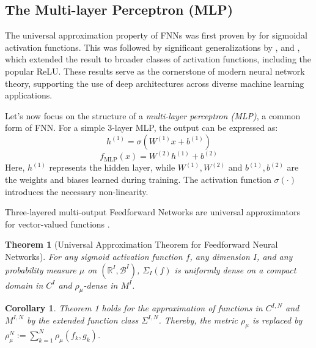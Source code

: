 \documentclass{article}
\newtheorem{theorem}{Theorem}
\newtheorem{corollary}{Corollary}[theorem]
\theoremstyle{definition}
\theoremstyle{remark}
\newcounter{ct}
\begin{document}
\citep{mhaskar2019function}

\subsection{The Multi-layer Perceptron (MLP)}

The universal approximation property of FNNs was first proven by \citep{cybenko1989approximation} for sigmoidal activation functions. This was followed by significant generalizations by \citep{hornik1989multilayer}, \citep{funahashi1989approximate} and \citep{hechtnielsen1992backpropagation}, which extended the result to broader classes of activation functions, including the popular ReLU.
These results serve as the cornerstone of modern neural network theory, supporting the use of deep architectures across diverse machine learning applications.



Let’s now focus on the structure of a \textit{multi-layer perceptron (MLP)}, a common form of FNN. For a simple 3-layer MLP, the output can be expressed as:
\[
h^{(1)} = \sigma(W^{(1)} x + b^{(1)})
\]
\[
f_{\text{MLP}}(x) = W^{(2)} h^{(1)} + b^{(2)}
\]
Here, \(h^{(1)}\) represents the hidden layer, while \(W^{(1)}, W^{(2)}\) and \(b^{(1)}, b^{(2)}\) are the weights and biases learned during training. The activation function \(\sigma(\cdot)\) introduces the necessary non-linearity.


Three-layered multi-output Feedforward Networks are universal approximators for vector-valued functions \citep{irie1988capabilities}.

\begin{theorem}[Universal Approximation Theorem for Feedforward Neural Networks\citep{hornik1989multilayer,schafer2007uap}]
For any sigmoid activation function \( f \), any dimension \( I \), and any probability measure \( \mu \) on \( (\mathbb{R}^I, \mathcal{B}^I) \), \( \Sigma_I(f) \) is uniformly dense on a compact domain in \( C^I \) and \( \rho_{\mu} \)-dense in \( M^I \).
\end{theorem}

\begin{corollary}%
Theorem 1 holds for the approximation of functions in \( C^{I,N} \) and \( M^{I,N} \) by the extended function class \( \Sigma^{I,N} \). Thereby, the metric \( \rho_{\mu} \) is replaced by \( \rho_{\mu}^N := \sum_{k=1}^{N} \rho_{\mu}(f_k, g_k) \).
\end{corollary}
\end{document}

